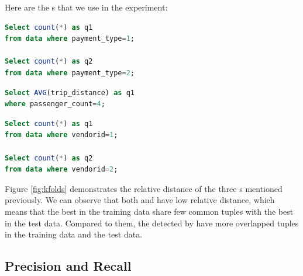 

Here are the {\fact}s that we use in the experiment:

\renewcommand{\lstlistingname}{{Fact}}%
\begin{lstlisting}[language=SQL, caption=q1/q2, label=qry:o1]
Select count(*) as q1 
from data where payment_type=1;

Select count(*) as q2 
from data where payment_type=2;
\end{lstlisting}

\begin{lstlisting}[language=SQL, caption=q1, label=qry:o2]
Select AVG(trip_distance) as q1 
where passenger_count=4;
\end{lstlisting}

\begin{lstlisting}[language=SQL, caption=q1/q2, label=qry:o3]
Select count(*) as q1 
from data where vendorid=1;

Select count(*) as q2 
from data where vendorid=2;
\end{lstlisting}

Figure \ref{fig:kfolds} demonstrates the relative distance of the three {\fact}s mentioned previously. We can observe that both {\aggravation} and {\intervention} have low relative distance, which means that the best {\explanation} in the training data share few common tuples with the best {\explanation} in the test data. Compared to them, the {\explanation} detected by {\solution} have more overlapped tuples in the training data and the test data. 

\subsection{Precision and Recall}

